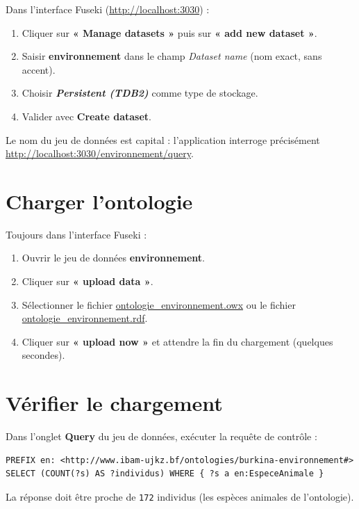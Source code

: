 ﻿\documentclass[12pt,a4paper]{report}
\begin{document}
Dans l'interface Fuseki (\url{http://localhost:3030}) :

\begin{enumerate}
\item Cliquer sur \textbf{« Manage datasets »} puis sur \textbf{« add new dataset »}.
\item Saisir \textbf{environnement} dans le champ \emph{Dataset name} (nom exact, sans accent).
\item Choisir \textbf{\emph{Persistent (TDB2)}} comme type de stockage.
\item Valider avec \textbf{Create dataset}.
\end{enumerate}

\noindent Le nom du jeu de données est capital : l'application interroge précisément
\url{http://localhost:3030/environnement/query}.

\section{Charger l'ontologie}

Toujours dans l'interface Fuseki :

\begin{enumerate}
\item Ouvrir le jeu de données \textbf{environnement}.
\item Cliquer sur \textbf{« upload data »}.
\item Sélectionner le fichier \url{ontologie_environnement.owx} ou le fichier
\url{ontologie_environnement.rdf}.
\item Cliquer sur \textbf{« upload now »} et attendre la fin du chargement (quelques secondes).
\end{enumerate}

\section{Vérifier le chargement}

Dans l'onglet \textbf{Query} du jeu de données, exécuter la requête de contrôle :

\begin{lstlisting}
PREFIX en: <http://www.ibam-ujkz.bf/ontologies/burkina-environnement#>
SELECT (COUNT(?s) AS ?individus) WHERE { ?s a en:EspeceAnimale }
\end{lstlisting}

\noindent La réponse doit être proche de \texttt{172} individus (les espèces animales de l'ontologie).
\end{document}
